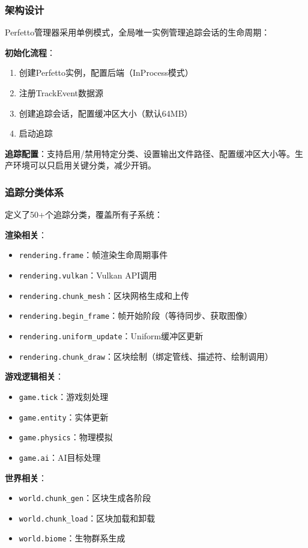 \subsubsection{架构设计}

Perfetto管理器采用单例模式，全局唯一实例管理追踪会话的生命周期：

\textbf{初始化流程}：
\begin{enumerate}
    \item 创建Perfetto实例，配置后端（InProcess模式）
    \item 注册TrackEvent数据源
    \item 创建追踪会话，配置缓冲区大小（默认64MB）
    \item 启动追踪
\end{enumerate}

\textbf{追踪配置}：支持启用/禁用特定分类、设置输出文件路径、配置缓冲区大小等。生产环境可以只启用关键分类，减少开销。

\subsubsection{追踪分类体系}

定义了50+个追踪分类，覆盖所有子系统：

\textbf{渲染相关}：
\begin{itemize}
    \item \texttt{rendering.frame}：帧渲染生命周期事件
    \item \texttt{rendering.vulkan}：Vulkan API调用
    \item \texttt{rendering.chunk\_mesh}：区块网格生成和上传
    \item \texttt{rendering.begin\_frame}：帧开始阶段（等待同步、获取图像）
    \item \texttt{rendering.uniform\_update}：Uniform缓冲区更新
    \item \texttt{rendering.chunk\_draw}：区块绘制（绑定管线、描述符、绘制调用）
\end{itemize}

\textbf{游戏逻辑相关}：
\begin{itemize}
    \item \texttt{game.tick}：游戏刻处理
    \item \texttt{game.entity}：实体更新
    \item \texttt{game.physics}：物理模拟
    \item \texttt{game.ai}：AI目标处理
\end{itemize}

\textbf{世界相关}：
\begin{itemize}
    \item \texttt{world.chunk\_gen}：区块生成各阶段
    \item \texttt{world.chunk\_load}：区块加载和卸载
    \item \texttt{world.biome}：生物群系生成
\end{itemize}

